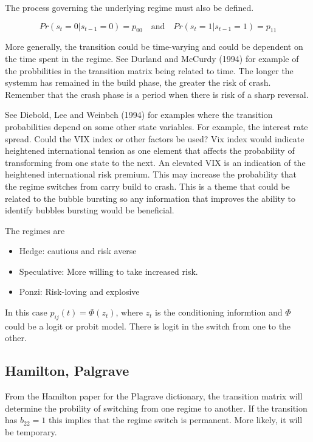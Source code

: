\documentclass[12pt, a4paper, oneside]{article} %
\begin{document}
The process governing the underlying regime must also be defined. 

\begin{equation}
Pr(s_t = 0| s_{t-1} = 0) = p_{00} \quad \text{and} \quad Pr(s_t = 1| s_{t-1} = 1) = p_{11}
\end{equation}

More generally, the transition could be time-varying and could be dependent on the time spent in the regime.  See Durland and McCurdy (1994) for example of the probbilities  in the transition matrix being related to time. The longer the systemm has remained in the build phase, the greater the risk of crash.  Remember that the crash phase is a period when there is risk of a sharp reversal.  

See Diebold, Lee and Weinbch (1994) for examples where the transition probabilities depend on some other state variables.  For example, the interest rate spread.   Could the VIX index or other factors be used?  Vix index would indicate heightened international tension as one element that affects the probability of transforming from one state to the next.  An elevated VIX is an indication of the heightened international risk premium.  This may increase the probability that the regime switches from carry build to crash.  This is a theme that could be related to the bubble bursting so any information that improves the ability to identify bubbles bursting would be beneficial.  

The regimes are
\begin{itemize}
\item Hedge: cautious and risk averse
\item Speculative: More willing to take increased risk. 
\item Ponzi:  Risk-loving and explosive
\end{itemize}


In this case $p_{ij}(t) = \Phi(z_t)$, where $z_t$ is the conditioning informtion and $\Phi$ could be a logit or probit model.  There is logit in the switch from one to the other.  

\subsection{Hamilton, Palgrave}
From the Hamilton paper for the Plagrave dictionary, the transition matrix will determine the probility of switching from one regime to another.  If the transition has $b_{22} = 1$ this implies that the regime switch is permanent. More likely, it will be temporary. 
 
\end{document}
